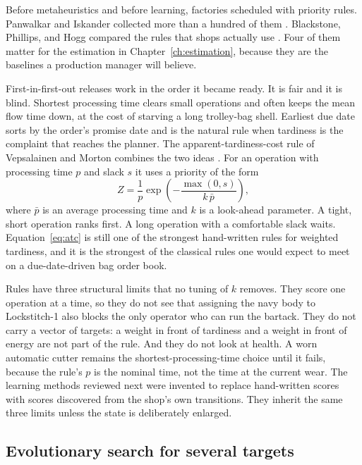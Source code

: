 Before metaheuristics and before learning, factories scheduled with priority rules. Panwalkar and Iskander collected more than a hundred of them \cite{panwalkar1977}. Blackstone, Phillips, and Hogg compared the rules that shops actually use \cite{blackstone1982}. Four of them matter for the estimation in Chapter~\ref{ch:estimation}, because they are the baselines a production manager will believe.

First-in-first-out releases work in the order it became ready. It is fair and it is blind. Shortest processing time clears small operations and often keeps the mean flow time down, at the cost of starving a long trolley-bag shell. Earliest due date sorts by the order's promise date and is the natural rule when tardiness is the complaint that reaches the planner. The apparent-tardiness-cost rule of Vepsalainen and Morton combines the two ideas \cite{vepsalainen1987}. For an operation with processing time \(p\) and slack \(s\) it uses a priority of the form
\begin{equation}
Z = \frac{1}{p}\exp\left(-\frac{\max(0,s)}{k\,\bar p}\right),
\label{eq:atc}
\end{equation}
where \(\bar p\) is an average processing time and \(k\) is a look-ahead parameter. A tight, short operation ranks first. A long operation with a comfortable slack waits. Equation~\eqref{eq:atc} is still one of the strongest hand-written rules for weighted tardiness, and it is the strongest of the classical rules one would expect to meet on a due-date-driven bag order book.

Rules have three structural limits that no tuning of \(k\) removes. They score one operation at a time, so they do not see that assigning the navy body to Lockstitch-1 also blocks the only operator who can run the bartack. They do not carry a vector of targets: a weight in front of tardiness and a weight in front of energy are not part of the rule. And they do not look at health. A worn automatic cutter remains the shortest-processing-time choice until it fails, because the rule's \(p\) is the nominal time, not the time at the current wear. The learning methods reviewed next were invented to replace hand-written scores with scores discovered from the shop's own transitions. They inherit the same three limits unless the state is deliberately enlarged.

\subsection{Evolutionary search for several targets}


